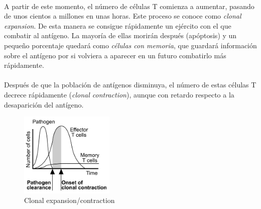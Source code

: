 \documentclass{article}
\begin{document}
 	 \\
 	 A partir de este momento, el número de células T comienza a aumentar, pasando de unos cientos a millones en unas horas. Este proceso se conoce como \textit{clonal expansion}. De esta manera se consigue rápidamente un ejército con el que combatir al antígeno. La mayoría de ellas morirán después (apóptosis) y un pequeño porcentaje quedará como \textit{células con memoria}, que guardará información sobre el antígeno por si volviera a aparecer en un futuro combatirlo más rápidamente.
 	 \\
 	 \\
 	 Después de que la población de antígenos disminuya, el número de estas células T decrece rápidamente (\textit{clonal contraction}), aunque con retardo respecto a la desaparición del antígeno.
 	 
 	 \begin{figure}[h!]
 	 	\centering
 	 	\includegraphics[width=0.4\textwidth]{clonalExpContr}
 	 	\caption{Clonal expansion/contraction}
 	 	\label{fig:ejemplo}
 	 \end{figure}
	 
\end{document}
